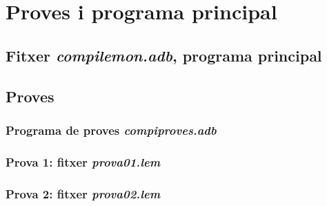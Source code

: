 \section{Proves i programa principal}

\subsection{Fitxer \emph{compilemon.adb}, programa principal}

\newpage

\subsection{Proves}
\subsubsection{Programa de proves \emph{compiproves.adb}}

\newpage

\subsubsection{Prova 1: fitxer \emph{prova01.lem}}

\newpage

\subsubsection{Prova 2: fitxer \emph{prova02.lem}}

\newpage
